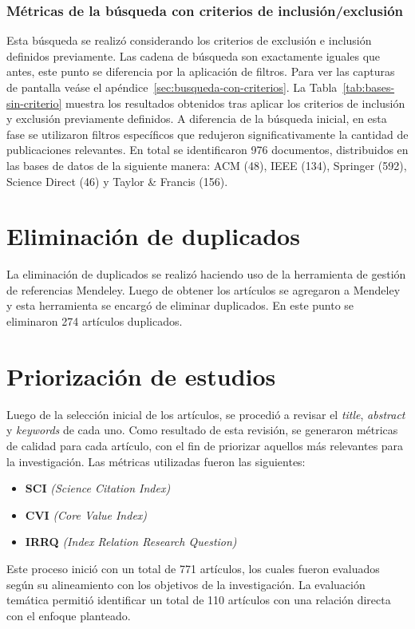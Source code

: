 \subsubsection{Métricas de la búsqueda con criterios de inclusión/exclusión}\label{subsec:resumenBusquedaCriterios}
\noindent
Esta búsqueda se realizó considerando los criterios de exclusión e inclusión definidos previamente. Las cadena de búsqueda son exactamente iguales que antes, este punto se diferencia por la aplicación de filtros. Para ver las capturas de pantalla veáse el apéndice~\ref{sec:busqueda-con-criterios}.
La Tabla~\ref{tab:bases-sin-criterio} muestra los resultados obtenidos tras aplicar los criterios de inclusión y exclusión previamente definidos. A diferencia de la búsqueda inicial, en esta fase se utilizaron filtros específicos que redujeron significativamente la cantidad de publicaciones relevantes. En total se identificaron 976 documentos, distribuidos en las bases de datos de la siguiente manera: ACM (48), IEEE (134), Springer (592), Science Direct (46) y Taylor \& Francis (156).




\section{Eliminación de duplicados}\label{sec:eliminacionDuplicados}
\noindent
La eliminación de duplicados se realizó haciendo uso de la herramienta de gestión de referencias Mendeley. Luego de obtener los artículos se agregaron a Mendeley y esta herramienta se encargó de eliminar duplicados. En este punto se eliminaron 274 artículos duplicados.

\section{Priorización de estudios}\label{sec:priorizacionEstudios}
\noindent
Luego de la selección inicial de los artículos, se procedió a revisar el \textit{title}, \textit{abstract} y \textit{keywords} de cada uno. Como resultado de esta revisión, se generaron métricas de calidad para cada artículo, con el fin de priorizar aquellos más relevantes para la investigación. Las métricas utilizadas fueron las siguientes:

\begin{itemize}
    \item \textbf{SCI} \textit{(Science Citation Index)}
    \item \textbf{CVI} \textit{(Core Value Index)}
    \item \textbf{IRRQ} \textit{(Index Relation Research Question)}
\end{itemize}
\noindent
Este proceso inició con un total de 771 artículos, los cuales fueron evaluados según su alineamiento con los objetivos de la investigación. La evaluación temática permitió identificar un total de 110 artículos con una relación directa con el enfoque planteado.

